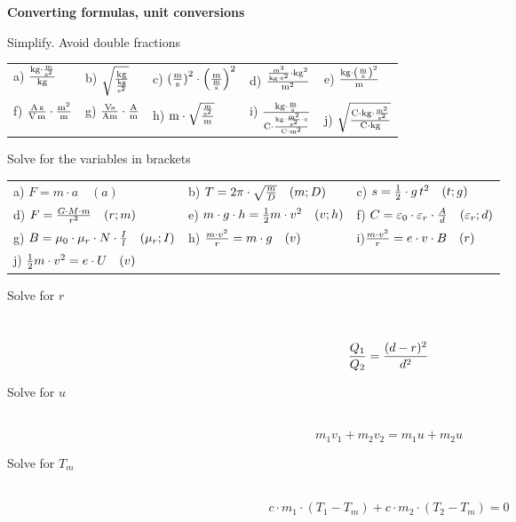 \documentclass[a4paper]{article}
\begin{document}
	{\bf Converting formulas, unit conversions}
	\begin{enumerate}[1.]
		{\bf \item Simplify. Avoid double fractions}
		
		\renewcommand{\arraystretch}{2}
		\begin{tabular}{p{3 cm}p{3 cm}p{3 cm}p{3 cm}p{3 cm}}
			a) $ { \SI{}{\kilogram\cdot{\meter\over \second^2}} \over \SI{}{\kilogram}} $ & b) $\sqrt{\SI{}{\kilogram} \over \SI{}{\kilogram\over {\second^2}} }$ & c) $ \SI{}{({\meter\over \second})}^2 \cdot \left({\SI{}{\meter} \over \SI{}{\meter\over \second}}\right)^2$ & d) $ {\SI{}{{\meter^3}\over \kilogram\cdot{\second^2}} \cdot \SI{}{\kilogram^2} \over \SI{}{\meter^2}}$ & e) ${\SI{}{\kilogram} \cdot \left(\SI{}{\meter\over \second}\right)^2 \over \SI{}{\meter}}$\\ 
		f) ${ \SI{}{\ampere\second} \over \SI{}{\volt\meter}} \cdot {\SI{}{{\meter^2}\over \meter} }$ & g) $ \SI{}{\volt\second\over \ampere\meter} \cdot \SI{}{\ampere\over \meter}$ & h) $\SI{}{\meter} \cdot \sqrt{ \SI{}{\meter\over {\second^2}} \over\SI{}{\meter} }$ & i) ${\SI{}{\kilogram\cdot{\meter\over \second}}\over \SI{}{\coulomb} \cdot {\SI{}{\kilogram\cdot{\meter^2\over \second^2}} \cdot \SI{}{\second} \over \SI{}{\coulomb\cdot\meter^2}}}$ & j) $\sqrt{\SI{}{\coulomb} \cdot {\SI{}{\kilogram\cdot{\meter^2\over \second^2}}} \over \SI{}{\coulomb\cdot\kilogram}}$\\
		
			
		\end{tabular}
		
		{\bf \item Solve for the variables in brackets}
		
		\renewcommand{\arraystretch}{2}
		\begin{tabular}{p{5.5 cm}p{5.5 cm}p{5.5 cm}}
			a) $ {F=m\cdot a } \quad(a)$ & b) $T=2 \pi \cdot \sqrt{{m\over D}}\quad(m; D)$ & c) $ s = {1 \over 2} \cdot g \, t^2 \quad (t; g)$ \\
			d) $F={G \cdot M \cdot m \over r^2} \quad (r; m)$ &
			e) $m\cdot g \cdot h ={1\over 2}m\cdot v^2 \quad (v; h)$ & f) $C= \varepsilon_0 \cdot \varepsilon_r \cdot {A \over d } \quad(\varepsilon_r; d)$ \\
			g) $B= \mu_0 \cdot \mu_r \cdot N \cdot {I \over l}\quad (\mu_r; I)$ &
			h) $ {m \cdot v^2 \over r}= m \cdot g \quad (v) $ & i)$ {m \cdot v^2 \over r} = e \cdot v \cdot B \quad (r) $ \\
			j) ${1 \over 2} m \cdot v^2 = e \cdot U \quad (v)$
		\end{tabular}
		
		{\bf \item Solve for $r$}\\
		$$ {Q_1 \over Q_2}= {(d-r)^2 \over d^2}$$
		
		{\bf \item Solve for $u$}\\
		$$m_1v_1 + m_2v_2 = m_1u + m_2u$$
		
		{\bf \item Solve for $T_m$}\\
		$$c\cdot m_1 \cdot(T_1-T_m) + c \cdot m_2 \cdot ( T_2 - T_m) = 0 $$
		
	\end{enumerate}
\end{document}
